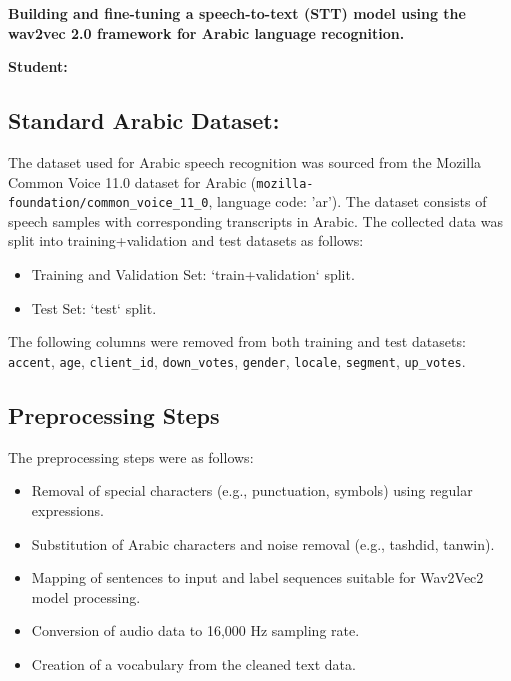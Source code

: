 \documentclass[a4paper,12pt]{article}
\begin{document}
\begin{Large}
    \textsf{\textbf{ Building and fine-tuning a speech-to-text (STT) model using the wav2vec 2.0 framework for Arabic language recognition.}}
\end{Large}

\vspace{1ex}

\textsf{\textbf{Student:}} \vspace{1ex}


\subsection*{Standard Arabic Dataset:}

The dataset used for Arabic speech recognition was sourced from the Mozilla Common Voice 11.0 dataset for Arabic (\texttt{mozilla-foundation/common\_voice\_11\_0}, language code: 'ar'). The dataset consists of speech samples with corresponding transcripts in Arabic. The collected data was split into training+validation and test datasets as follows:

\begin{itemize}
    \item Training and Validation Set: `train+validation` split.
    \item Test Set: `test` split.
\end{itemize}

The following columns were removed from both training and test datasets: \texttt{accent}, \texttt{age}, \texttt{client\_id}, \texttt{down\_votes}, \texttt{gender}, \texttt{locale}, \texttt{segment}, \texttt{up\_votes}.

\subsection*{Preprocessing Steps}

The preprocessing steps were as follows:

\begin{itemize}
    \item Removal of special characters (e.g., punctuation, symbols) using regular expressions.
    \item Substitution of Arabic characters and noise removal (e.g., tashdid, tanwin).
    \item Mapping of sentences to input and label sequences suitable for Wav2Vec2 model processing.
    \item Conversion of audio data to 16,000 Hz sampling rate.
    \item Creation of a vocabulary from the cleaned text data.
\end{itemize}
\end{document}
